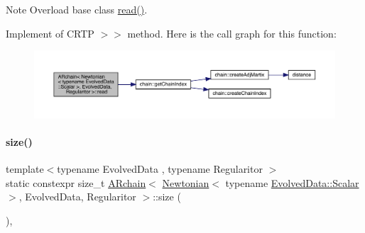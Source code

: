 \begin{DoxyNote}{Note}
Overload base class \mbox{\hyperlink{class_a_rchain_3_01_newtonian_3_01typename_01_evolved_data_1_1_scalar_01_4_00_01_evolved_data_00_01_regularitor_01_4_aa4b0a64e05c3942e402606e74c08b593}{read()}}.
\end{DoxyNote}
Implement of C\+R\+TP \textquotesingle{}$>$$>$\textquotesingle{} method. Here is the call graph for this function\+:\nopagebreak
\begin{figure}[H]
\begin{center}
\leavevmode
\includegraphics[width=350pt]{class_a_rchain_3_01_newtonian_3_01typename_01_evolved_data_1_1_scalar_01_4_00_01_evolved_data_00_01_regularitor_01_4_aa4b0a64e05c3942e402606e74c08b593_cgraph}
\end{center}
\end{figure}
\mbox{\label{class_a_rchain_3_01_newtonian_3_01typename_01_evolved_data_1_1_scalar_01_4_00_01_evolved_data_00_01_regularitor_01_4_a928601b10d9a9e5ab02f36cf11efa263}} 
\paragraph{\texorpdfstring{size()}{size()}}
{\footnotesize\ttfamily template$<$typename Evolved\+Data , typename Regularitor $>$ \\
static constexpr size\+\_\+t \mbox{\hyperlink{class_a_rchain}{A\+Rchain}}$<$ \mbox{\hyperlink{class_newtonian}{Newtonian}}$<$ typename \mbox{\hyperlink{class_a_rchain_a707e42a79e4744424a34c9007e84ee07}{Evolved\+Data\+::\+Scalar}} $>$, Evolved\+Data, Regularitor $>$\+::size (\begin{DoxyParamCaption}{ }\end{DoxyParamCaption})\hspace{0.3cm}{\ttfamily [inline]}, {\ttfamily [static]}}



